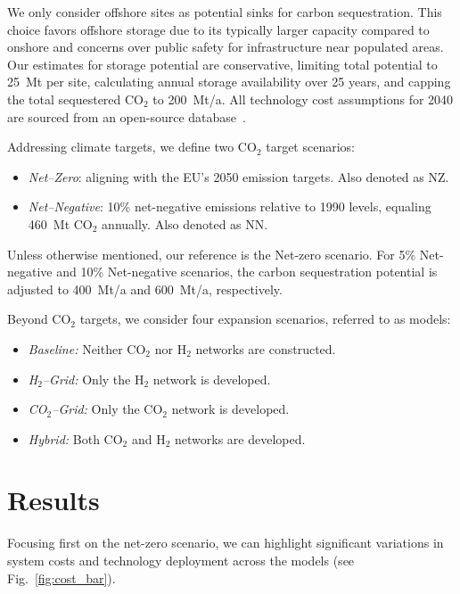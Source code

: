 \documentclass[twocolumn]{article}
\newcommand{\carbon}{CO$_2$}
\newcommand{\hydrogen}{H$_2$}
\newcommand{\hydrogengrid}{\hydrogen{}--Grid}
\newcommand{\carbongrid}{\carbon{}--Grid}
\begin{document}
We only consider offshore sites as potential sinks for carbon sequestration. This choice favors offshore storage due to its typically larger capacity compared to onshore and concerns over public safety for infrastructure near populated areas. Our estimates for storage potential are conservative, limiting total potential to 25~Mt per site, calculating annual storage availability over 25 years, and capping the total sequestered \carbon{} to 200~Mt/a. All technology cost assumptions for 2040 are sourced from an open-source database~\cite{lisazeyenPyPSATechnologydataTechnology2023}.


Addressing climate targets, we define two \carbon{} target scenarios:
\begin{itemize}
    \item[] \textit{Net--Zero}: aligning with the EU's 2050 emission targets. Also denoted as NZ.
    \item[] \textit{Net--Negative}: 10\% net-negative emissions relative to 1990 levels, equaling 460~Mt \carbon{} annually. Also denoted as NN.
\end{itemize}
Unless otherwise mentioned, our reference is the Net-zero scenario. For 5\% Net-negative and 10\% Net-negative scenarios, the carbon sequestration potential is adjusted to 400~Mt/a and 600~Mt/a, respectively.

Beyond \carbon{} targets, we consider four expansion scenarios, referred to as models:
\begin{itemize}
    \item[] \textit{Baseline:} Neither \carbon{} nor \hydrogen{} networks are constructed.
    \item[] \textit{\hydrogengrid:} Only the \hydrogen{} network is developed.
    \item[] \textit{\carbongrid:} Only the \carbon{} network is developed.
    \item[] \textit{Hybrid:} Both \carbon{} and \hydrogen{} networks are developed.
\end{itemize}



\section{Results}
\label{sec:results}


Focusing first on the net-zero scenario, we can highlight significant variations in system costs and technology deployment across the models (see Fig.~\ref{fig:cost_bar}).
\end{document}
